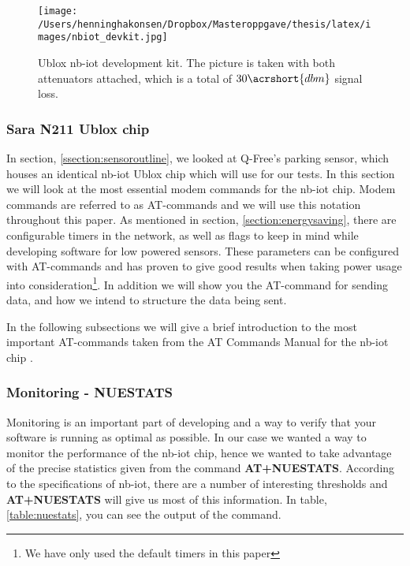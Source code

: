 \documentclass[USenglish]{ifimaster}  %
\begin{document}
\begin{figure}[ht]
  \centering\texttt{[image: /Users/henninghakonsen/Dropbox/Masteroppgave/thesis/latex/images/nbiot\_devkit.jpg]}
  \caption[Closeup of Ublox \acrshort{nb-iot} development kit]{Ublox \acrshort{nb-iot} development kit. The picture is taken with both attenuators attached, which is a total of ${30\acrshort{dbm}}$ signal loss.}
  \label{pic:nbiotdevkit}
\end{figure}

\subsubsection{Sara N211 Ublox chip} \label{section:thechip}
In section, \vref{ssection:sensoroutline}, we looked at Q-Free's parking sensor, which houses an identical \acrshort{nb-iot} Ublox chip which will use for our tests. In this section we will look at the most essential modem commands for the \acrshort{nb-iot} chip. Modem commands are referred to as AT-commands and we will use this notation throughout this paper. As mentioned in section, \vref{section:energysaving}, there are configurable timers in the network, as well as flags to keep in mind while developing software for low powered sensors. These parameters can be configured with AT-commands and has proven to give good results when taking power usage into consideration\footnote{We have only used the default timers in this paper}. In addition we will show you the AT-command for sending data, and how we intend to structure the data being sent.

In the following subsections we will give a brief introduction to the most important AT-commands taken from the AT Commands Manual for the \acrshort{nb-iot} chip \cite{atcommand:ubloxchip}.

\subsubsection{Monitoring - NUESTATS}
Monitoring is an important part of developing and a way to verify that your software is running as optimal as possible. In our case we wanted a way to monitor the performance of the \acrshort{nb-iot} chip, hence we wanted to take advantage of the precise statistics given from the command \textbf{AT+NUESTATS}. According to the specifications of \acrshort{nb-iot}, there are a number of interesting thresholds and \textbf{AT+NUESTATS} will give us most of this information. In table, \vref{table:nuestats}, you can see the output of the command.
\end{document}
